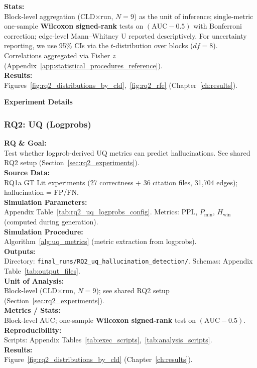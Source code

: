 \textbf{Stats:}\\
Block-level aggregation (CLD$\times$run, $N{=}9$) as the unit of inference; single-metric one-sample \textbf{Wilcoxon signed-rank} tests on $(\mathrm{AUC}-0.5)$ with Bonferroni correction; edge-level Mann--Whitney U reported descriptively. For uncertainty reporting, we use 95\% CIs via the $t$-distribution over blocks ($df{=}8$). Correlations aggregated via Fisher $z$ (Appendix~\ref{app:statistical_procedures_reference}).\\
\textbf{Results:}\\
Figures~\ref{fig:rq2_distributions_by_cld},~\ref{fig:rq2_rfe} (Chapter~\ref{ch:results}).

\noindent\textbf{Experiment Details}

\subsubsection{RQ2: UQ (Logprobs)}
\label{sec:rq2_uq_logprobs}

\textbf{RQ \& Goal:}\\
Test whether logprob-derived UQ metrics can predict hallucinations. See shared RQ2 setup (Section~\ref{sec:rq2_experiments}).\\
\textbf{Source Data:}\\
RQ1a GT Lit experiments (27 correctness + 36 citation files, 31,704 edges); hallucination = FP/FN.\\
\textbf{Simulation Parameters:}\\
Appendix Table~\ref{tab:rq2_uq_logprobs_config}. Metrics: PPL, $P_{\min}$, $H_{\text{win}}$ (computed during generation).\\
\textbf{Simulation Procedure:}\\
Algorithm~\ref{alg:uq_metrics} (metric extraction from logprobs).\\
\textbf{Outputs:}\\
Directory: \texttt{final\_runs/RQ2\_uq\_hallucination\_detection/}. Schemas: Appendix Table~\ref{tab:output_files}.\\
\textbf{Unit of Analysis:}\\
Block-level (CLD$\times$run, $N=9$); see shared RQ2 setup (Section~\ref{sec:rq2_experiments}).\\
\textbf{Metrics / Stats:}\\
Block-level AUC; one-sample \textbf{Wilcoxon signed-rank} test on $(\mathrm{AUC}-0.5)$.\\
\textbf{Reproducibility:}\\
Scripts: Appendix Tables~\ref{tab:exec_scripts},~\ref{tab:analysis_scripts}.\\
\textbf{Results:}\\
Figure~\ref{fig:rq2_distributions_by_cld} (Chapter~\ref{ch:results}).

